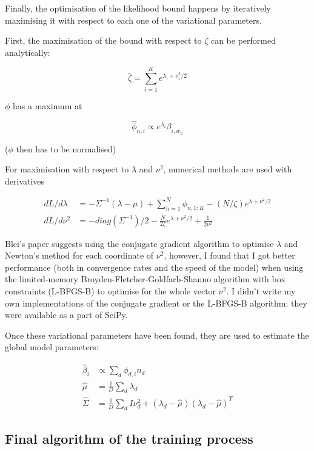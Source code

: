 \documentclass[12pt,a4paper,twoside,openright]{report}
\begin{document}
Finally, the optimisation of the likelihood bound happens by iteratively maximising it with respect to each one of the variational parameters.

First, the maximisation of the bound with respect to $\zeta$ can be performed analytically:

\begin{equation}
\hat\zeta = \sum\limits_{i=1}^Ke^{\lambda_i + \nu_i^2 / 2}
\end{equation}

$\phi$ has a maximum at

\begin{equation}
\hat\phi_{n, i} \propto e^{\lambda_i}\beta_{i, w_n} \label{eq:phiopt}
\end{equation}

($\phi$ then has to be normalised)

For maximisation with respect to $\lambda$ and $\nu^2$, numerical methods are used with derivatives

\begin{align}
dL/d\lambda & = -\Sigma^{-1}(\lambda - \mu) + \sum\limits_{n=1}^N\phi_{n, 1:K} - (N/\zeta)e^{\lambda + \nu^2/2} \\
dL/d\nu^2 & = -\mathit{diag}(\Sigma^{-1})/2 - \frac{N}{2\zeta}e^{\lambda + \nu^2/2} + \frac{1}{2\nu^2}
\end{align}

Blei's paper suggests using the conjugate gradient algorithm to optimise $\lambda$ and Newton's method for each coordinate of $\nu^2$, however, I found that I got better performance (both in convergence rates and the speed of the model) when using the limited-memory Broyden-Fletcher-Goldfarb-Shanno algorithm with box constraints (L-BFGS-B) to optimise for the whole vector $\nu^2$. I didn't write my own implementations of the conjugate gradient or the L-BFGS-B algorithm: they were available as a part of SciPy.

Once these variational parameters have been found, they are used to estimate the global model parameters:

\begin{align}
\hat\beta_i & \propto \sum\limits_d\phi_{d, i}n_d \\ \label{eq:betaopt}
\hat\mu & = \frac{1}{D} \sum\limits_d\lambda_d \\ 
\hat\Sigma & = \frac{1}{D} \sum\limits_d I\nu^2_d + (\lambda_d - \hat\mu)(\lambda_d - \hat\mu)^T
\end{align}

\subsection{Final algorithm of the training process}
\end{document}
